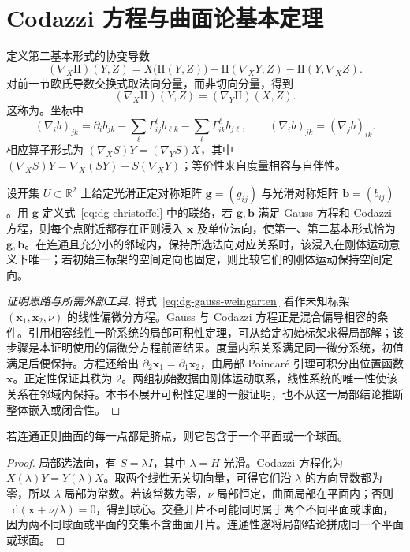\documentclass[UTF8,12pt,a4paper,fontset=fandol]{ctexbook}
\newcommand{\R}{\mathbb R}
\newcommand{\dd}{\mathop{}\!\mathrm d}
\begin{document}
\section{Codazzi 方程与曲面论基本定理}
定义第二基本形式的协变导数
\[
 (\nabla_X\mathrm{II})(Y,Z)=X\bigl(\mathrm{II}(Y,Z)\bigr)
 -\mathrm{II}(\nabla_XY,Z)-\mathrm{II}(Y,\nabla_XZ).
\]
对前一节欧氏导数交换式取法向分量，而非切向分量，得到
\begin{equation}
 (\nabla_X\mathrm{II})(Y,Z)=(\nabla_Y\mathrm{II})(X,Z).
 \label{eq:dg-codazzi}
\end{equation}
这称为。坐标中
\[
 (\nabla_i b)_{jk}=\partial_i b_{jk}
 -\sum_\ell\Gamma^\ell_{ij}b_{\ell k}
 -\sum_\ell\Gamma^\ell_{ik}b_{j\ell},\qquad
 (\nabla_i b)_{jk}=(\nabla_j b)_{ik}.
\]
相应算子形式为 $(\nabla_XS)Y=(\nabla_YS)X$，其中 $(\nabla_XS)Y=\nabla_X(SY)-S(\nabla_XY)$；等价性来自度量相容与自伴性。

\begin{theorem}
设开集 $U\subset\R^2$ 上给定光滑正定对称矩阵 $\mathbf g=(g_{ij})$ 与光滑对称矩阵 $\mathbf b=(b_{ij})$。用 $\mathbf g$ 定义式~\eqref{eq:dg-christoffel} 中的联络，若 $\mathbf g,\mathbf b$ 满足 Gauss 方程和 Codazzi 方程，则每个点附近都存在正则浸入 $\mathbf x$ 及单位法向，使第一、第二基本形式恰为 $\mathbf g,\mathbf b$。在连通且充分小的邻域内，保持所选法向对应关系时，该浸入在刚体运动意义下唯一；若初始三标架的空间定向也固定，则比较它们的刚体运动保持空间定向。
\label{thm:dg-surface-fundamental}
\end{theorem}
\begin{proof}[证明思路与所需外部工具]
将式~\eqref{eq:dg-gauss-weingarten} 看作未知标架 $(\mathbf x_1,\mathbf x_2,\nu)$ 的线性偏微分方程。Gauss 与 Codazzi 方程正是混合偏导相容的条件。引用相容线性一阶系统的局部可积性定理，可从给定初始标架求得局部解；该步骤是本证明使用的偏微分方程前置结果。度量内积关系满足同一微分系统，初值满足后便保持。方程还给出 $\partial_2\mathbf x_1=\partial_1\mathbf x_2$，由局部 Poincar\'e 引理可积分出位置函数 $\mathbf x$。正定性保证其秩为 $2$。两组初始数据由刚体运动联系，线性系统的唯一性使该关系在邻域内保持。本书不展开可积性定理的一般证明，也不从这一局部结论推断整体嵌入或闭合性。
\end{proof}

\begin{corollary}[全脐曲面的刚性]
若连通正则曲面的每一点都是脐点，则它包含于一个平面或一个球面。
\end{corollary}
\begin{proof}
局部选法向，有 $S=\lambda I$，其中 $\lambda=H$ 光滑。Codazzi 方程化为 $X(\lambda)Y=Y(\lambda)X$。取两个线性无关切向量，可得它们沿 $\lambda$ 的方向导数都为零，所以 $\lambda$ 局部为常数。若该常数为零，$\nu$ 局部恒定，曲面局部在平面内；否则 $\dd(\mathbf x+\nu/\lambda)=0$，得到球心。交叠开片不可能同时属于两个不同平面或球面，因为两不同球面或平面的交集不含曲面开片。连通性遂将局部结论拼成同一个平面或球面。
\end{proof}
\end{document}
